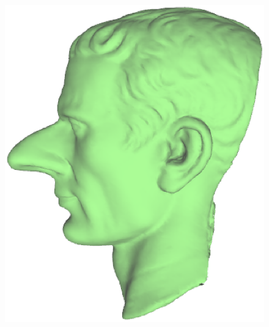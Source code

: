 \begin{figure} [htbp]
{\begin{minipage}[b]{0.32\textwidth}
      \includegraphics[scale=0.25]{figs/f5.7.0flexible-1.eps}
    \end{minipage}}
\end{figure}
